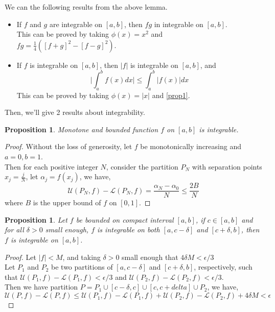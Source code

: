 \documentclass[a4paper]{article}
\newtheorem{prop}[theorem]{Proposition}
\numberwithin{equation}{subsection}
\begin{document}
\par We can the following results from the above lemma.
\begin{itemize}
    \item If $f$ and $g$ are integrable on $[a, b]$, then $f g$ in integrable on $[a, b]$. \\
          This can be proved by taking $\phi(x) = x^2$ and $fg = \frac{1}{4}([f+g]^2-[f-g]^2)$.
    \item If $f$ is integrable on $[a, b]$, then $|f|$ is integrable on $[a, b]$, and
          \begin{equation}
              \lvert \int_a^b f(x)dx \rvert \leq \int_a^b |f(x)|dx
          \end{equation}
          This can be proved by taking $\phi(x) = \lvert x \rvert$ and \cref{prop1}.
\end{itemize}

\par Then, we'll give 2 results about integrability.

\begin{prop}
    Monotone and bounded function $f$ on $[a, b]$ is integrable.
\end{prop}
\begin{proof}
    Without the loss of generosity, let $f$ be monotonically increasing and $a = 0, b = 1$. \\
    Then for each positive integer $N$, consider the partition $P_N$ with separation points $x_j = \frac{j}{N}$, let $\alpha_j = f(x_j)$, we have,
    \begin{equation}
        \mathcal{U}(P_N, f) - \mathcal{L}(P_N, f) = \frac{\alpha_N - \alpha_0}{N} \leq \frac{2B}{N}
    \end{equation}
    where $B$ is the upper bound of $f$ on $[0, 1]$.
\end{proof}

\begin{prop}
    \label{prop2}
    Let $f$ be bounded on compact interval $[a, b]$, if $c \in [a, b]$ and for all $\delta>0$ small enough, $f$ is integrable on both $[a, c-\delta]$ and $[c+\delta, b]$, then $f$ is integrable on $[a, b]$.
\end{prop}
\begin{proof}
    Let $|f| < M$, and taking $\delta>0$ small enough that $4\delta M < \epsilon / 3$ \\
    Let $P_1$ and $P_2$ be two partitions of $[a, c-\delta]$ and $[c+\delta, b]$, respectively, such that $\mathcal{U}(P_1, f) - \mathcal{L}(P_1, f) < \epsilon / 3$ and $\mathcal{U}(P_2, f) - \mathcal{L}(P_2, f) < \epsilon / 3$. \\
    Then we have partition $P = P_1 \cup [c-\delta, c] \cup [c, c+delta] \cup P_2$, we have,
    \begin{equation}
        \mathcal{U}(P, f) - \mathcal{L}(P, f) \leq \mathcal{U}(P_1, f) - \mathcal{L}(P_1, f) + \mathcal{U}(P_2, f) - \mathcal{L}(P_2, f) + 4\delta M < \epsilon
    \end{equation}
\end{proof}
\end{document}
